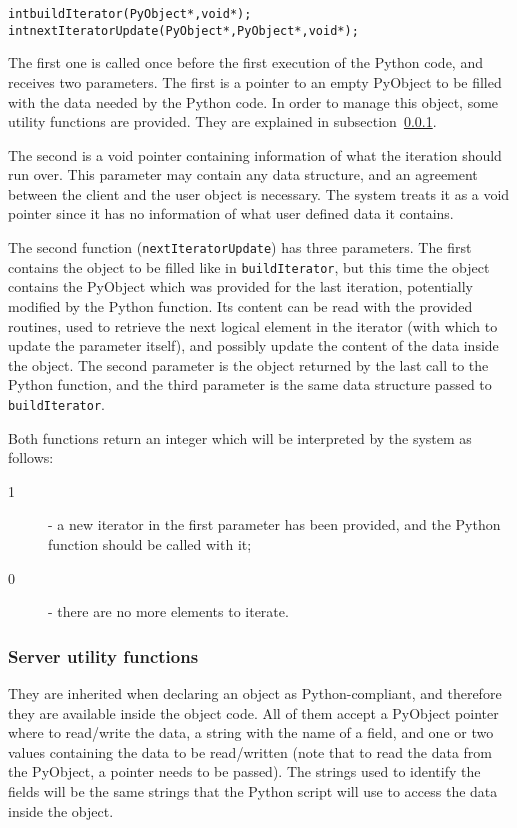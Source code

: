 \begin{alltt}
int buildIterator(PyObject*, void*);
int nextIteratorUpdate(PyObject*, PyObject*, void*);
\end{alltt}

The first one is called once before the first execution of the Python code, and
receives two parameters. The first is a pointer to an empty PyObject to be filled with
the data needed by the Python code. In order to manage this object, some utility
functions are provided. They are explained in subsection~\ref{pythonUtilityFuncs}.

The second is a void pointer containing information of what the iteration should
run over. This parameter may contain any data structure, and an agreement between the
client and the user object is necessary. The system treats it as a void pointer
since it has no information of what user defined data it contains.

The second function (\texttt{nextIteratorUpdate}) has three parameters. The
first contains the object to be filled like in \texttt{buildIterator}, but this
time the object contains the PyObject which was provided for the last iteration,
potentially modified by the Python function. Its content can be read with the
provided routines, used to retrieve the next logical element in the iterator
(with which to update the parameter itself), and possibly update the content of
the data inside the \charmpp{} object. The second parameter is the object
returned by the last call to the Python function, and the third parameter is the
same data structure passed to \texttt{buildIterator}.

Both functions return an integer which will be interpreted by the system as follows:
\begin{description}
\item[1] - a new iterator in the first parameter has been provided, and the Python function should be called with it;
\item[0] - there are no more elements to iterate.
\end{description}

\subsubsection{Server utility functions}

\label{pythonUtilityFuncs}

They are inherited when declaring an object as Python-compliant, and therefore
they are available inside the object code. All of them accept a PyObject pointer
where to read/write the data, a string with the name of a field, and one or two
values containing the data to be read/written (note that to read the data from
the PyObject, a pointer needs to be passed). The strings used to identify the
fields will be the same strings that the Python script will use to access the
data inside the object.


